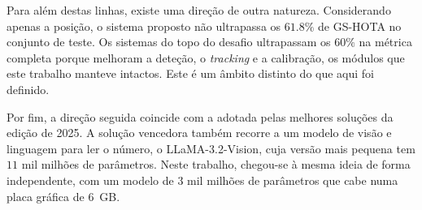 Para além destas linhas, existe uma direção de outra natureza. Considerando apenas a posição, o sistema proposto não ultrapassa os $61.8\%$ de GS-HOTA no conjunto de teste. Os sistemas do topo do desafio ultrapassam os $60\%$ na métrica completa porque melhoram a deteção, o \emph{tracking} e a calibração, os módulos que este trabalho manteve intactos. Este é um âmbito distinto do que aqui foi definido.

Por fim, a direção seguida coincide com a adotada pelas melhores soluções da edição de 2025. A solução vencedora também recorre a um modelo de visão e linguagem para ler o número, o LLaMA-3.2-Vision, cuja versão mais pequena tem $11$ mil milhões de parâmetros. Neste trabalho, chegou-se à mesma ideia de forma independente, com um modelo de $3$ mil milhões de parâmetros que cabe numa placa gráfica de $6$~GB.

